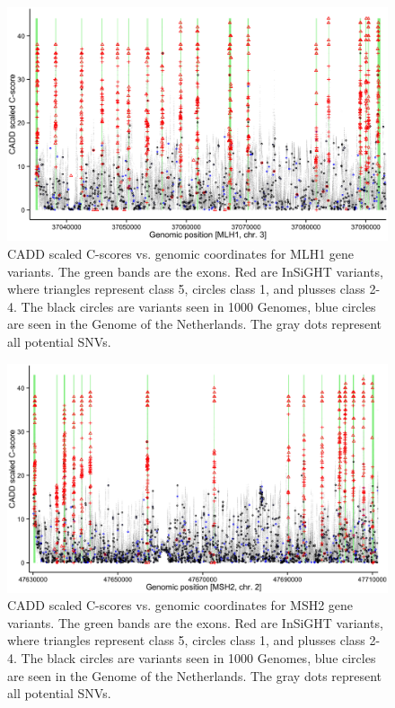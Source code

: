 \begin{figure}
\centering
\includegraphics[width=1.0\linewidth]{img/caddmmr_mlh1}
\caption[CADD scaled C-scores for MLH1 gene]{CADD scaled C-scores vs. genomic coordinates for MLH1 gene variants. The green bands are the exons. Red are InSiGHT variants, where triangles represent class 5, circles class 1, and plusses class 2-4. The black circles are variants seen in 1000 Genomes\cite{McVean_2012}, blue circles are seen in the Genome of the Netherlands\cite{Boomsma_2014,Francioli_2014}. The gray dots represent all potential SNVs.}
\label{fig:caddmmr_mlh1}
\end{figure}

\begin{figure}
\centering
\includegraphics[width=1.0\linewidth]{img/caddmmr_msh2}
\caption[CADD scaled C-scores for MSH2 gene]{CADD scaled C-scores vs. genomic coordinates for MSH2 gene variants. The green bands are the exons. Red are InSiGHT variants, where triangles represent class 5, circles class 1, and plusses class 2-4. The black circles are variants seen in 1000 Genomes\cite{McVean_2012}, blue circles are seen in the Genome of the Netherlands\cite{Boomsma_2014,Francioli_2014}. The gray dots represent all potential SNVs.}
\label{fig:caddmmr_msh2}
\end{figure}

